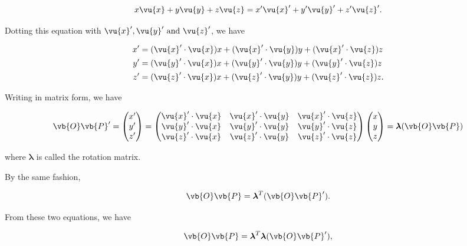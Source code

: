 \documentclass[a4paper,12pt]{report}
\begin{document}
\begin{equation}
	x \vu{x}  + y \vu{y} + z \vu{z} = x' \vu{x} ' + y' \vu{y} ' + z' \vu{z} '.  
\end{equation}

Dotting this equation with \(\vu{x} ', \vu{y} ' \text{ and } \vu{z} '\), we have 

\begin{equation}
	\begin{aligned}
	x' &= (\vu{x} ' \cdot \vu{x} )x + (\vu{x} ' \cdot \vu{y} )y + (\vu{x} ' \cdot \vu{z} )z \\
	y' &= (\vu{y} ' \cdot \vu{x} )x + (\vu{y} ' \cdot \vu{y} )y + (\vu{y} ' \cdot \vu{z} )z \\
	z' &= (\vu{z} ' \cdot \vu{x} )x + (\vu{z} ' \cdot \vu{y} )y + (\vu{z} ' \cdot \vu{z} )z.
	\end{aligned}
\end{equation}

Writing in matrix form, we have 

\begin{equation}
	\vb{O} \vb{P} ' = \begin{pmatrix}
	x'\\
	y'\\
	z'
	\end{pmatrix}
	= \begin{pmatrix}
\vu{x} ' \cdot \vu{x}  & \vu{x} ' \cdot \vu{y}  & \vu{x} ' \cdot \vu{z}  \\
\vu{y} ' \cdot \vu{x}  & \vu{y} ' \cdot \vu{y} & \vu{y} ' \cdot \vu{z} \\
\vu{z} ' \cdot \vu{x}  & \vu{z} ' \cdot \vu{y}  & \vu{z} ' \cdot \vu{z} 
	\end{pmatrix}
	\begin{pmatrix}
	x\\
	y\\
	z
	\end{pmatrix}
	=
	 \boldsymbol{\lambda } (\vb{O} \vb{P} )
\end{equation}

where \(\boldsymbol{\lambda } \) is called the rotation matrix. 

By the same fashion, 

\begin{equation}
	\vb{O} \vb{P}  = \boldsymbol{\lambda } ^{T} (\vb{O} \vb{P}  ').
\end{equation}

From these two equations, we have 

\begin{equation}
	\vb{O} \vb{P}  = \boldsymbol{\lambda } ^{T} \boldsymbol{\lambda } (\vb{O} \vb{P} '), 
\end{equation}
\end{document}
